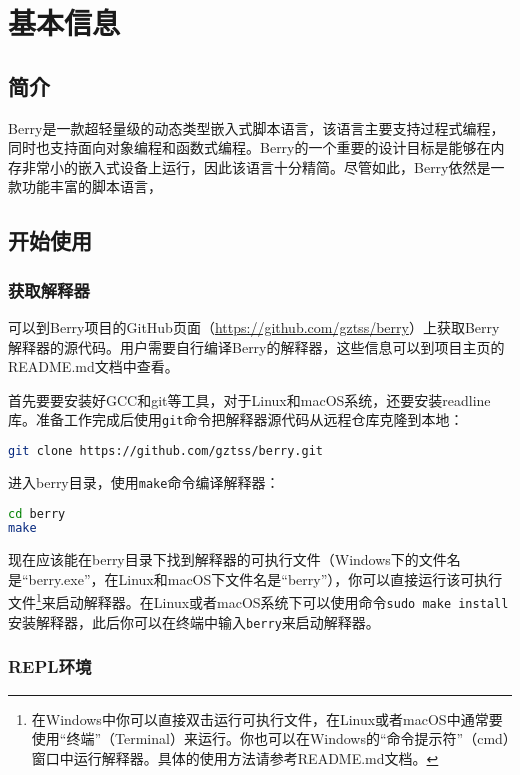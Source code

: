 \chapter{基本信息}

\section{简介}

Berry是一款超轻量级的动态类型嵌入式脚本语言，该语言主要支持过程式编程，同时也支持面向对象编程和函数式编程。Berry的一个重要的设计目标是能够在内存非常小的嵌入式设备上运行，因此该语言十分精简。尽管如此，Berry依然是一款功能丰富的脚本语言，

\section{开始使用}

\subsection{获取解释器}

可以到Berry项目的GitHub页面（\url{https://github.com/gztss/berry}）上获取Berry解释器的源代码。用户需要自行编译Berry的解释器，这些信息可以到项目主页的README.md文档中查看。

首先要要安装好GCC和git等工具，对于Linux和macOS系统，还要安装readline库。准备工作完成后使用\texttt{git}命令把解释器源代码从远程仓库克隆到本地：
\begin{lstlisting}[language=bash, numbers=none]
git clone https://github.com/gztss/berry.git
\end{lstlisting}
进入berry目录，使用\texttt{make}命令编译解释器：
\begin{lstlisting}[language=bash, numbers=none]
cd berry
make
\end{lstlisting}

现在应该能在berry目录下找到解释器的可执行文件（Windows下的文件名是``berry.exe''，在Linux和macOS下文件名是``berry''），你可以直接运行该可执行文件\footnote{在Windows中你可以直接双击运行可执行文件，在Linux或者macOS中通常要使用``终端''（Terminal）来运行。你也可以在Windows的``命令提示符''（cmd）窗口中运行解释器。具体的使用方法请参考README.md文档。}来启动解释器。在Linux或者macOS系统下可以使用命令\texttt{sudo make install}安装解释器，此后你可以在终端中输入\texttt{berry}来启动解释器。

\subsection{REPL环境}

